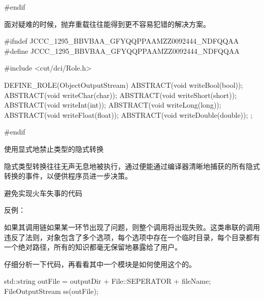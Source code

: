 \begin{content}
\begin{leftbar}
\begin{c++}[caption={\ttfamily{io/ObjectOutputStream.h}}]
#endif
\end{c++}
\end{leftbar}

面对疑难的时候，抛弃重载往往能得到更不容易犯错的解决方案。

\begin{leftbar}
\begin{c++}[caption={\ttfamily{io/ObjectOutputStream.h}}]
#ifndef JCCC_1295_BBVBAA_GFYQQPPAAMZZ0092444_NDFQQAA
#define JCCC_1295_BBVBAA_GFYQQPPAAMZZ0092444_NDFQQAA

#include <cut/dci/Role.h>

DEFINE_ROLE(ObjectOutputStream)
{
    ABSTRACT(void writeBool(bool));
    ABSTRACT(void writeChar(char));
    ABSTRACT(void writeShort(short));
    ABSTRACT(void writeInt(int));
    ABSTRACT(void writeLong(long));
    ABSTRACT(void writeFloat(float));
    ABSTRACT(void writeDouble(double));
};

#endif
\end{c++}
\end{leftbar}

\begin{regulation}
使用显式地禁止类型的隐式转换
\end{regulation}

隐式类型转换往往无声无息地被执行，通过便能通过编译器清晰地捕获的所有隐式转换的事件，以便供程序员进一步决策。

\begin{regulation}
避免实现火车失事的代码
\end{regulation}

反例：
\begin{leftbar}
\end{leftbar}

如果其调用链如果某一环节出现了问题，则整个调用将出现失败。这类串联的调用违反了法则，对象包含了多个选项，每个选项中存在一个临时目录，每个目录都有一个绝对路径，所有的知识都毫无保留地暴露给了用户。

仔细分析一下代码，再看看其中一个模块是如何使用这个的。

\begin{leftbar}
\begin{c++}[caption={客户代码}]
std::string outFile = outputDir + File::SEPERATOR + fileName;
FileOutputStream ss(outFile);
\end{c++}
\end{leftbar}


\end{content}
